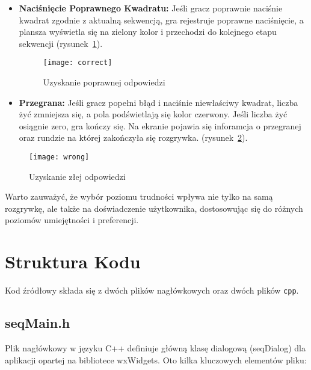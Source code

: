 \documentclass[]{report}
\begin{document}
\begin{itemize}
	\item \textbf{Naciśnięcie Poprawnego Kwadratu:} Jeśli gracz poprawnie naciśnie kwadrat zgodnie z aktualną sekwencją, gra rejestruje poprawne naciśnięcie, a plansza wyświetla się na zielony kolor i przechodzi do kolejnego etapu sekwencji (rysunek~\ref{fig:correct}).
	
			\begin{figure}[h]
		\centering
		\texttt{[image: correct]}
		\caption{Uzyskanie poprawnej odpowiedzi}
		\label{fig:correct}
	\end{figure}
	
	
	\item \textbf{Przegrana:} Jeśli gracz popełni błąd i naciśnie niewłaściwy kwadrat, liczba żyć zmniejsza się, a pola podświetlają się kolor czerwony. 
	\subitem Jeśli liczba żyć osiągnie zero, gra kończy się. Na ekranie pojawia się inforamcja o przegranej oraz rundzie na której zakończyła się rozgrywka. (rysunek~\ref{fig:wrong}).
\end{itemize}

	
\begin{figure}[h]
	\centering
	\texttt{[image: wrong]}
	\caption{Uzyskanie złej odpowiedzi}
	\label{fig:wrong}
\end{figure}


Warto zauważyć, że wybór poziomu trudności wpływa nie tylko na samą rozgrywkę, ale także na doświadczenie użytkownika, dostosowując się do różnych poziomów umiejętności i preferencji.
\newpage 

	\section *{Struktura Kodu}
	Kod źródłowy składa się z dwóch plików nagłówkowych oraz dwóch plików \texttt{cpp}. 

	
	\subsection*{seqMain.h}
	Plik nagłówkowy w języku C++ definiuje główną klasę dialogową (seqDialog) dla aplikacji opartej na bibliotece wxWidgets. Oto kilka kluczowych elementów pliku:
	
\end{document}
